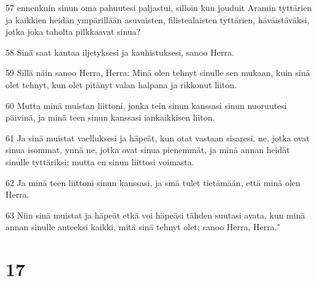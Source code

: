 \par 57 ennenkuin sinun oma pahuutesi paljastui, silloin kun jouduit Aramin tyttärien ja kaikkien heidän ympärillään asuvaisten, filistealaisten tyttärien, häväistäväksi, jotka joka taholta pilkkaavat sinua?
\par 58 Sinä saat kantaa iljetyksesi ja kauhistuksesi, sanoo Herra.
\par 59 Sillä näin sanoo Herra, Herra: Minä olen tehnyt sinulle sen mukaan, kuin sinä olet tehnyt, kun olet pitänyt valan halpana ja rikkonut liiton.
\par 60 Mutta minä muistan liittoni, jonka tein sinun kanssasi sinun nuoruutesi päivinä, ja minä teen sinun kanssasi iankaikkisen liiton.
\par 61 Ja sinä muistat vaelluksesi ja häpeät, kun otat vastaan sisaresi, ne, jotka ovat sinua isommat, ynnä ne, jotka ovat sinua pienemmät, ja minä annan heidät sinulle tyttäriksi; mutta en sinun liittosi voimasta.
\par 62 Ja minä teen liittoni sinun kanssasi, ja sinä tulet tietämään, että minä olen Herra.
\par 63 Niin sinä muistat ja häpeät etkä voi häpeäsi tähden suutasi avata, kun minä annan sinulle anteeksi kaikki, mitä sinä tehnyt olet; sanoo Herra, Herra."

\chapter{17}

